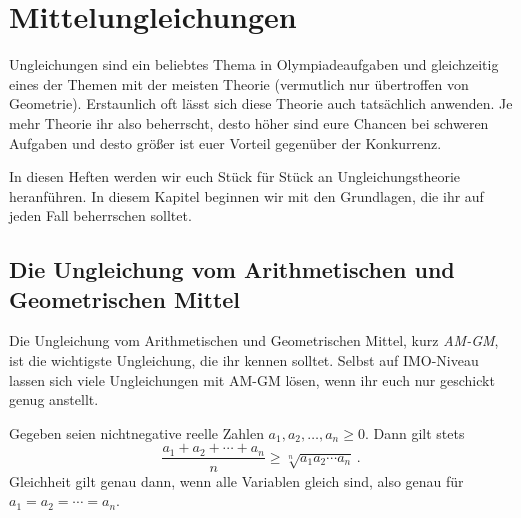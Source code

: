 \section{Mittelungleichungen}\label{kapitel:AM-GM}
Ungleichungen sind ein beliebtes Thema in Olympiadeaufgaben und gleichzeitig eines der Themen mit der meisten Theorie (vermutlich nur übertroffen von Geometrie). Erstaunlich oft lässt sich diese Theorie auch tatsächlich anwenden. Je mehr Theorie ihr also beherrscht, desto höher sind eure Chancen bei schweren Aufgaben und desto größer ist euer Vorteil gegenüber der Konkurrenz.

In diesen Heften werden wir euch Stück für Stück an Ungleichungstheorie heranführen. In diesem Kapitel beginnen wir mit den Grundlagen, die ihr auf jeden Fall beherrschen solltet.

\subsection*{Die Ungleichung vom Arithmetischen und Geometrischen Mittel}
Die Ungleichung vom Arithmetischen und Geometrischen Mittel, kurz \emph{AM-GM}, ist die wichtigste Ungleichung, die ihr kennen solltet. Selbst auf IMO-Niveau lassen sich viele Ungleichungen mit AM-GM lösen, wenn ihr euch nur geschickt genug anstellt.
\begin{satzmitnamen}
	Gegeben seien nichtnegative reelle Zahlen $a_1,a_2,\dotsc,a_n\geqslant 0$. Dann gilt stets
	\begin{equation*}
		\frac{a_1+a_2+\dotsb+a_n}{n}\geqslant \sqrt[n]{a_1a_2\dotsm a_n}\,.
	\end{equation*}
	Gleichheit gilt genau dann, wenn alle Variablen gleich sind, also genau für $a_1=a_2=\dotsb=a_n$.
\end{satzmitnamen}
